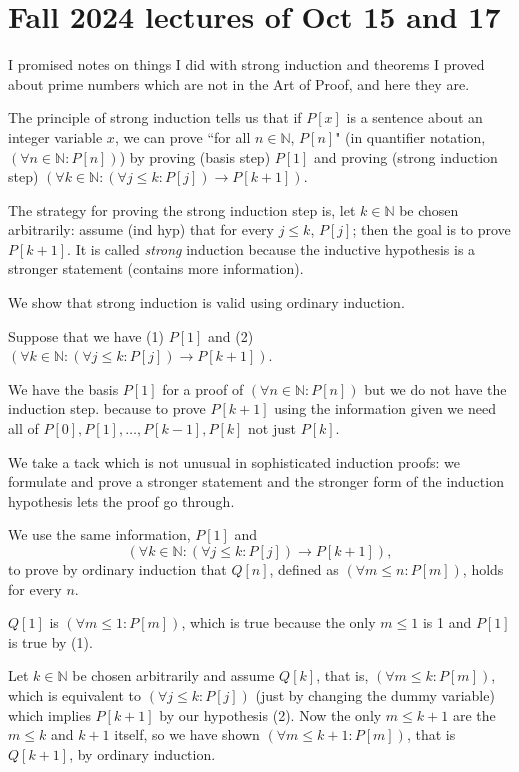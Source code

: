 \documentclass[12pt]{article}
\begin{document}
\newpage

\section{Fall 2024 lectures of Oct 15 and 17}

I promised notes on things I did with strong induction and theorems I proved about prime numbers which are not in the Art of Proof, and here they are.

The principle of strong induction tells us that if $P[x]$ is a sentence about an integer variable $x$, we can prove
``for all $n \in \mathbb N$, $P[n]$" (in quantifier notation, $(\forall n \in \mathbb N:P[n])$) by proving (basis step) $P[1]$
and proving (strong induction step) $(\forall k \in \mathbb N:(\forall j \leq k:P[j]) \rightarrow P[k+1])$.

The strategy for proving the strong induction step is, let $k \in \mathbb N$ be chosen arbitrarily:  assume (ind hyp) that for every $j \leq k$, $P[j]$;  then the goal is to prove $P[k+1]$.   It is called {\em strong\/} induction because the inductive hypothesis is a stronger statement (contains more information).

We show that strong induction is valid using ordinary induction.

Suppose that we have (1) $P[1]$ and (2) $(\forall k \in \mathbb N:(\forall j \leq k:P[j]) \rightarrow P[k+1])$.

We have the basis $P[1]$ for a proof of $(\forall n \in \mathbb N:P[n])$ but we do not have the induction step.
because to prove $P[k+1]$ using the information given we need all of $P[0], P[1],\ldots, P[k-1],P[k]$ not just $P[k]$.

We take a tack which is not unusual in sophisticated induction proofs:  we formulate and prove a stronger statement and the stronger form of the induction hypothesis lets the proof go through.

We use the same information, $P[1]$ and $$(\forall k \in \mathbb N:(\forall j \leq k:P[j]) \rightarrow P[k+1]),$$ to prove
by ordinary induction that $Q[n]$, defined as $(\forall m \leq n:P[m])$, holds for every $n$.

$Q[1]$ is $(\forall m \leq 1:P[m])$, which is true because the only $m \leq 1$ is 1 and $P[1]$ is true by (1).

Let $k \in \mathbb N$ be chosen arbitrarily and assume $Q[k]$, that is, $(\forall m \leq k:P[m])$, which is equivalent
to $(\forall j \leq k:P[j])$ (just by changing the dummy variable) which implies $P[k+1]$ by our hypothesis (2).  Now the only $m \leq k+1$ are the $m \leq k$ and $k+1$ itself, so we have shown $(\forall m \leq k+1:P[m])$, that is $Q[k+1]$, by ordinary induction.
\end{document}
